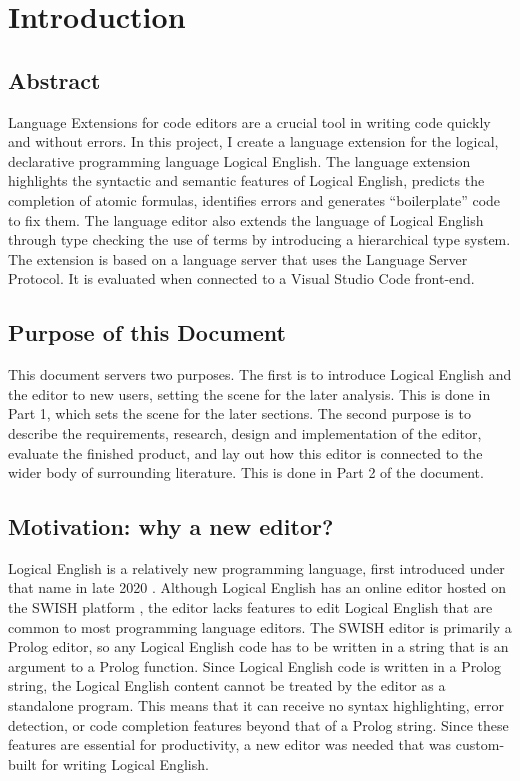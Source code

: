 \documentclass[../main.tex]{subfiles}
\begin{document}
\chapter{Introduction}
\section{Abstract}
Language Extensions for code editors are a crucial tool in writing code quickly and without errors. In this project, I create a language extension for the logical, declarative programming language Logical English. The language extension highlights the syntactic and semantic features of Logical English, predicts the completion of atomic formulas, identifies errors and generates ``boilerplate'' code to fix them. The language editor also extends the language of Logical English through type checking the use of terms by introducing a hierarchical type system. The extension is based on a language server that uses the Language Server Protocol. It is evaluated when connected to a Visual Studio Code front-end.

\section{Purpose of this Document}
This document servers two purposes. The first is to introduce Logical English and the editor to new users, setting the scene for the later analysis. This is done in Part 1, which sets the scene for the later sections. The second purpose is to describe the requirements, research, design and implementation of the editor, evaluate the finished product, and lay out how this editor is connected to the wider body of surrounding literature. This is done in Part 2 of the document.

\section{Motivation: why a new editor?}
Logical English is a relatively new programming language, first introduced under that name in late 2020 \cite{logical_english}. Although Logical English has an online editor hosted on the SWISH platform \cite{swish_editor}, the editor lacks features to edit Logical English that are common to most programming language editors. The SWISH editor is primarily a Prolog editor, so any Logical English code has to be written in a string that is an argument to a Prolog function. Since Logical English code is written in a Prolog string, the Logical English content cannot be treated by the editor as a standalone program. This means that it can receive no syntax highlighting, error detection, or code completion features beyond that of a Prolog string. Since these features are essential for productivity, a new editor was needed that was custom-built for writing Logical English.
\end{document}
